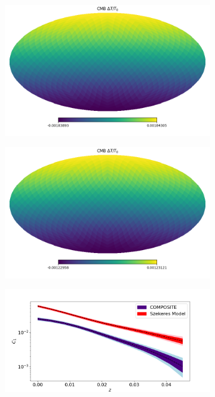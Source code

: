 \documentclass[a4paper,12pt]{report}
\begin{document}
\begin{figure}[t]
    \centering
    \begin{subfigure}[b]{0.45\textwidth}
        \centering
        \includegraphics[width=\textwidth]{BNW Model MCMC/Special Geometry One/CMB/CMB.png}
        \caption{}
    \end{subfigure}
    \begin{subfigure}[b]{0.45\textwidth}
        \centering
        \includegraphics[width=\textwidth]{BNW Model MCMC/Special Geometry One/COMPOSITE/CMB.png}
        \caption{}
    \end{subfigure}
    \begin{subfigure}[b]{0.45\textwidth}
        \centering
        \includegraphics[width=\textwidth]{BNW Model MCMC/Special Geometry One/CMB/Hub C1.png}

\end{subfigure}
\end{figure}
\end{document}
